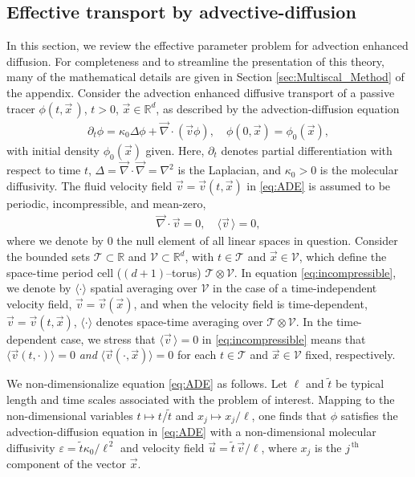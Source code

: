 \documentclass[11pt]{amsart}
\newcommand{\Tc}{\mathcal{T}}
\newcommand{\Vc}{\mathcal{V}}
\begin{document}
\subsection{Effective transport by
  advective-diffusion} \label{sec:Eff_Trans}  
%
In this section, we review the effective parameter problem for
advection enhanced diffusion. For completeness and to streamline the
presentation of this theory, many of the mathematical details are
given in Section \ref{sec:Multiscal_Method} of the appendix.
Consider the advection enhanced diffusive transport of a passive
tracer $\phi(t,\vec{x}\,)$, $t>0$, $\vec{x}\in\mathbb{R}^d$, as described by
the advection-diffusion equation 
%
\begin{align}\label{eq:ADE}
  \partial_t\phi=\kappa_0\Delta \phi+\vec{\nabla}\cdot(\vec{v}\phi), \quad
  \phi(0,\vec{x})=\phi_0(\vec{x}),
\end{align}
% 
with initial density $\phi_0(\vec{x})$ given. Here, $\partial_t$ denotes partial
differentiation with respect to time $t$, $\Delta=\vec{\nabla}\cdot\vec{\nabla}=\nabla^2$ is
the Laplacian, and $\kappa_0>0$ is the molecular diffusivity. The fluid
velocity field $\vec{v}=\vec{v}(t,\vec{x})$ in \eqref{eq:ADE} is
assumed to be periodic, incompressible, and mean-zero, %
%
\begin{align}\label{eq:incompressible}
  \vec{\nabla}\cdot\vec{v}=0, \quad
  \langle\vec{v}\,\rangle=0,
\end{align}
%
where we denote by $0$ the null element of all linear spaces in
question. Consider the bounded sets $\Tc\subset\mathbb{R}$ and
$\Vc\subset\mathbb{R}^d$, with $t\in\Tc$ and $\vec{x}\in\Vc$, which define the  
space-time period cell ($(d+1)$--torus) $\Tc\otimes\Vc$. In equation
\eqref{eq:incompressible}, we denote by $\langle\cdot\rangle$ spatial averaging over
$\Vc$ in the case of a time-independent velocity field,
$\vec{v}=\vec{v}(\vec{x})$, and when the velocity field is
time-dependent, $\vec{v}=\vec{v}(t,\vec{x})$, $\langle\cdot\rangle$ denotes space-time
averaging over $\Tc\otimes\Vc$. In the time-dependent case, we stress that
$\langle\vec{v}\,\rangle=0$ in \eqref{eq:incompressible} means that
$\langle\vec{v}(t,\cdot)\rangle=0$ \emph{and} $\langle\vec{v}(\cdot,\vec{x})\rangle=0$ for each
$t\in\Tc$ and $\vec{x}\in\Vc$ fixed, respectively. 



We non-dimensionalize equation
\eqref{eq:ADE} as follows. Let $\ell$ and $\tilde{t}$ be typical length
and time scales associated with the problem of interest. Mapping to
the non-dimensional variables $t\mapsto t/\tilde{t}$ and $x_j\mapsto x_j/\ell$, one
finds that $\phi$ satisfies the advection-diffusion equation in
\eqref{eq:ADE} with a non-dimensional molecular diffusivity
$\varepsilon=\tilde{t}\kappa_0/\ell^{\,2}$ and velocity field
$\vec{u}=\tilde{t}\,\vec{v}/\ell$, where $x_j$ is the $j^{\,\text{th}}$
component of the vector $\vec{x}$. 
\end{document}
